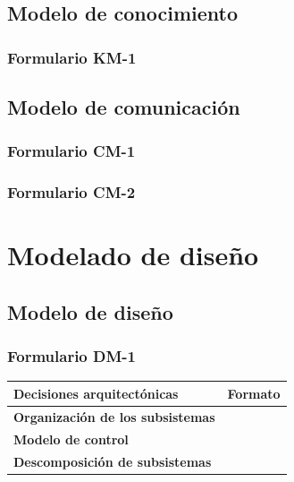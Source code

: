 \documentclass[a4paper,11pt]{article}
\begin{document}
		\subsection{Modelo de conocimiento}
			\subsubsection{Formulario KM-1}
		\subsection{Modelo de comunicación}
			\subsubsection{Formulario CM-1}
			\subsubsection{Formulario CM-2}
	\section{Modelado de diseño}
		\subsection{Modelo de diseño}
			\subsubsection{Formulario DM-1}
			\begin{center}
				\begin{tabular}{| l | l |}
					\hline
					\textbf{Decisiones arquitectónicas} & \textbf{Formato} \\
					\hline
					\textbf{Organización de los subsistemas} & \\
					\hline
					\textbf{Modelo de control} & \\
					\hline
					\textbf{Descomposición de subsistemas} & \\
					\hline
				\end{tabular}
			\end{center}
\end{document}

